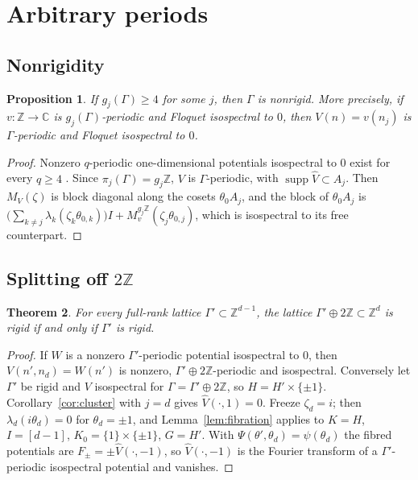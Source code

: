 \documentclass[11pt,reqno]{amsart}
\newtheorem{theorem}{Theorem}[section]
\newtheorem{proposition}[theorem]{Proposition}
\theoremstyle{definition}
\theoremstyle{remark}
\newcommand{\C}{\mathbb C}
\newcommand{\Z}{\mathbb Z}
\DeclareMathOperator{\supp}{supp}
\begin{document}
\section{Arbitrary periods}\label{sec:general}

\subsection{Nonrigidity}

\begin{proposition}\label{prop:nonrigid}
If $g_j(\Gamma)\ge4$ for some $j$, then $\Gamma$ is nonrigid.  More precisely,
if $v\colon\Z\to\C$ is $g_j(\Gamma)$-periodic and Floquet isospectral to $0$,
then $V(n)=v(n_j)$ is $\Gamma$-periodic and Floquet isospectral to $0$.
\end{proposition}

\begin{proof}
Nonzero $q$-periodic one-dimensional potentials isospectral to $0$ exist for
every $q\ge4$ \cite[Section~4.3 and Theorem~C]{CFK2026}.  Since
$\pi_j(\Gamma)=g_j\Z$, $V$ is $\Gamma$-periodic, with $\supp\widehat V\subset A_j$.
Then $M_V(\zeta)$ is block diagonal along the cosets $\theta_0A_j$, and the block
of $\theta_0A_j$ is
$\bigl(\sum_{k\ne j}\lambda_k(\zeta_k\theta_{0,k})\bigr)I+M^{g_j\Z}_v(\zeta_j\theta_{0,j})$,
which is isospectral to its free counterpart.
\end{proof}

\subsection{Splitting off \texorpdfstring{$2\Z$}{2Z}}

\begin{theorem}\label{thm:split2}
For every full-rank lattice $\Gamma'\subset\Z^{d-1}$, the lattice
$\Gamma'\oplus2\Z\subset\Z^d$ is rigid if and only if $\Gamma'$ is rigid.
\end{theorem}

\begin{proof}
If $W$ is a nonzero $\Gamma'$-periodic potential isospectral to $0$, then
$V(n',n_d)=W(n')$ is nonzero, $\Gamma'\oplus2\Z$-periodic and isospectral.
Conversely let $\Gamma'$ be rigid and $V$ isospectral for
$\Gamma=\Gamma'\oplus2\Z$, so $H=H'\times\{\pm1\}$.  Corollary~\ref{cor:cluster}
with $j=d$ gives $\widehat V(\cdot,1)=0$.  Freeze $\zeta_d=i$; then
$\lambda_d(i\theta_d)=0$ for $\theta_d=\pm1$, and Lemma~\ref{lem:fibration} applies
to $K=H$, $I=[d-1]$, $K_0=\{1\}\times\{\pm1\}$, $G=H'$.  With
$\Psi(\theta',\theta_d)=\psi(\theta_d)$ the fibred potentials are
$F_\pm=\pm\widehat V(\cdot,-1)$, so $\widehat V(\cdot,-1)$ is the Fourier
transform of a $\Gamma'$-periodic isospectral potential and vanishes.
\end{proof}
\end{document}
